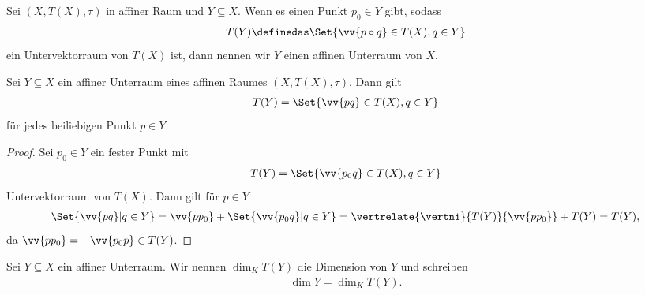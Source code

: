 \begin{definition*}
    Sei \( (X,T(X), \tau) \) in affiner Raum und \( Y\subseteq X \). Wenn es einen Punkt \( p_0 \in Y \) gibt, sodass
    \begin{align*}
        T(Y)\definedas \Set{\vv{p\circ q}\in T(X), q\in Y}
    \end{align*}
    ein Untervektorraum von \( T(X) \) ist, dann nennen wir \( Y \) einen affinen Unterraum von \( X \).
\end{definition*}
\begin{lemma}
    Sei \( Y\subseteq X \) ein affiner Unterraum eines affinen Raumes \( (X,T(X),\tau) \). Dann gilt
    \begin{align*}
        T(Y)=\Set{\vv{pq}\in T(X), q\in Y}
    \end{align*}
    für jedes beiliebigen Punkt \( p\in Y \).
\end{lemma}
\begin{proof}
    Sei \( p_0\in Y \) ein fester Punkt mit
    \begin{align*}
        T(Y)=\Set{\vv{p_0 q}\in T(X), q \in Y}
    \end{align*}
    Untervektorraum von \( T(X) \).
    Dann gilt für \( p \in Y \)
    \begin{align*}
        \Set{\vv{pq}|q\in Y}=\vv{pp_0}+\Set{\vv{p_0 q}| q\in Y}=\vertrelate{\vertni}{T(Y)}{\vv{p p_0}}+ T(Y)=T(Y),
    \end{align*}
    da \( \vv{p p_0}=-\vv{p_0 p}\in T(Y) \).
    
\end{proof}
\begin{definition*}
    Sei \( Y\subseteq X \) ein affiner Unterraum. Wir nennen \( \dim_K T(Y) \) die Dimension von \( Y \) und schreiben 
    \begin{align*}
        \dim Y=\dim_K T(Y).
    \end{align*}
\end{definition*}


